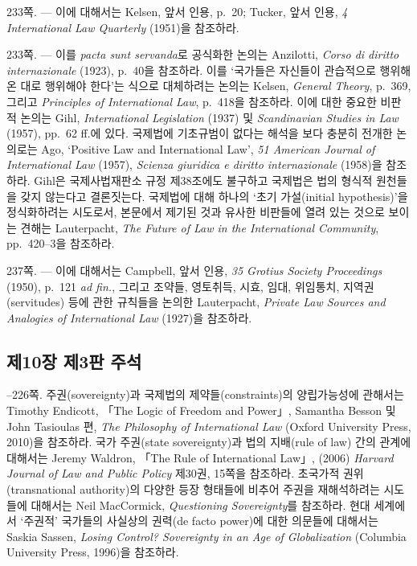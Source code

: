 {\noteentry 233쪽.  --- 이에
대해서는 Kelsen, 앞서 인용, p.~20; Tucker, 앞서 인용, \emph{4
International Law Quarterly} (1951)을 참조하라.

\noteentry 233쪽.  --- 이를 \emph{pacta sunt
servanda}로 공식화한 논의는 Anzilotti, \emph{Corso di diritto
internazionale} (1923), p.~40을 참조하라. 이를 ‘국가들은 자신들이
관습적으로 행위해 온 대로 행위해야 한다’는 식으로 대체하려는 논의는
Kelsen, \emph{General Theory}, p.~369, 그리고 \emph{Principles of
International Law}, p.~418을 참조하라. 이에 대한 중요한 비판적 논의는
Gihl, \emph{International Legislation} (1937) 및 \emph{Scandinavian
Studies in Law} (1957), pp.~62 ff.에 있다. 국제법에 기초규범이 없다는
해석을 보다 충분히 전개한 논의로는 Ago, `Positive Law and International
Law', \emph{51 American Journal of International Law} (1957),
\emph{Scienza giuridica e diritto internazionale} (1958)을 참조하라.
Gihl은 국제사법재판소 규정 제38조에도 불구하고 국제법은 법의 형식적
원천들을 갖지 않는다고 결론짓는다. 국제법에 대해 하나의 ‘초기
가설(initial hypothesis)’을 정식화하려는 시도로서, 본문에서 제기된 것과
유사한 비판들에 열려 있는 것으로 보이는 견해는 Lauterpacht, \emph{The
Future of Law in the International Community}, pp.~420--3을 참조하라.

\noteentry 237쪽.  --- 이에 대해서는 Campbell, 앞서 인용, \emph{35 Grotius Society
Proceedings} (1950), p.~121 \emph{ad fin.}, 그리고 조약들, 영토취득,
시효, 임대, 위임통치, 지역권(servitudes) 등에 관한 규칙들을 논의한
Lauterpacht, \emph{Private Law Sources and Analogies of International
Law} (1927)을 참조하라.

\subsection{제10장 제3판
주석}\label{uxc81c10uxc7a5-uxc81c3uxd310-uxc8fcuxc11d}

--226쪽.  주권(sovereignty)과 국제법의 제약들(constraints)의 양립가능성에
관해서는 Timothy Endicott, 「The Logic of Freedom and Power」, Samantha
Besson 및 John Tasioulas 편, \emph{The Philosophy of International Law}
(Oxford University Press, 2010)을 참조하라. 국가 주권(state
sovereignty)과 법의 지배(rule of law) 간의 관계에 대해서는 Jeremy
Waldron, 「The Rule of International Law」, (2006) \emph{Harvard Journal
of Law and Public Policy} 제30권, 15쪽을 참조하라. 초국가적
권위(transnational authority)의 다양한 등장 형태들에 비추어 주권을
재해석하려는 시도들에 대해서는 Neil MacCormick, \emph{Questioning
Sovereignty}를 참조하라. 현대 세계에서 ‘주권적’ 국가들의 사실상의
권력(de facto power)에 대한 의문들에 대해서는 Saskia Sassen,
\emph{Losing Control? Sovereignty in an Age of Globalization} (Columbia
University Press, 1996)을 참조하라.

}
